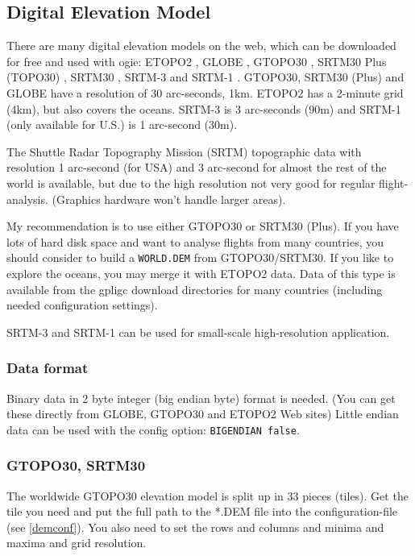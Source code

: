 \subsection{Digital Elevation Model}
\label{dem}

There are many digital elevation models on the web, which can be downloaded for free and used with ogie:
ETOPO2 \cite{etopo2}, GLOBE \cite{globe}, GTOPO30 \cite{gtopo30}, SRTM30 Plus (TOPO30) \cite{srtm30plus}, SRTM30 \cite{srtmv2}, SRTM-3 \cite{srtmv2} and SRTM-1 \cite{srtmv2}.
GTOPO30, SRTM30 (Plus) and GLOBE have a resolution of 30 arc-seconds, 1km.
ETOPO2 has a 2-minute grid (4km), but also covers the oceans.
SRTM-3 is 3 arc-seconds (90m) and SRTM-1 (only available for U.S.) is 1 arc-second (30m).

The Shuttle Radar Topography Mission (SRTM) topographic data
with resolution 1 arc-second (for USA) and 3 arc-second for almost the rest of the world
is available, but due to the high resolution not very good for regular flight-analysis. (Graphics
hardware won't handle larger areas).

My recommendation is to use either GTOPO30 or SRTM30 (Plus).
If you have lots of hard disk space and want to analyse flights from many countries, you should consider
to build a \texttt{WORLD.DEM} from GTOPO30/SRTM30. If you like to explore the oceans, you may merge
it with ETOPO2 data. Data of this type is available from the gpligc download directories for many countries (including needed configuration settings).

SRTM-3 and SRTM-1 can be used for small-scale high-resolution application.


\subsubsection*{Data format}

Binary data in 2 byte integer (big endian byte) format is needed.
(You can get these directly from GLOBE, GTOPO30 and ETOPO2 Web sites)
Little endian data can be used with the config option: \texttt{BIGENDIAN false}.


\subsubsection{GTOPO30, SRTM30}
The worldwide GTOPO30 \cite{gtopo30} elevation model is split up in 33 pieces (tiles).
Get the tile you need and put the full path to the *.DEM file into the
configuration-file (see \ref{demconf}). You also need to set the rows and columns
and minima and maxima and grid resolution.

